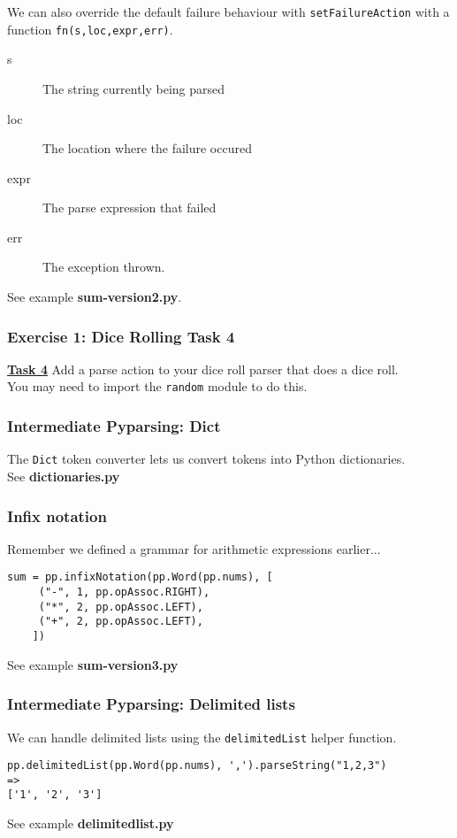 \documentclass{beamer}
\begin{document}
\begin{frame}
We can also override the default failure behaviour with \texttt{setFailureAction} with a function \texttt{fn(s,loc,expr,err)}. \\
\begin{description}
\item[s] The string currently being parsed
\item[loc] The location where the failure occured
\item[expr] The parse expression that failed
\item[err] The exception thrown.
\end{description}
\medskip
See example \textbf{sum-version2.py}.
\end{frame}


\begin{frame}
\frametitle{Exercise 1: Dice Rolling Task 4}
\textbf{\underline{Task 4}} Add a parse action to your dice roll parser that does a dice roll. \\
\medskip
You may need to import the \texttt{random} module to do this.
\end{frame}

\begin{frame}
\frametitle{Intermediate Pyparsing: Dict}
The \texttt{Dict} token converter lets us convert tokens into Python dictionaries. \\
\bigskip
See \textbf{dictionaries.py}

\end{frame}

\begin{frame}[fragile]
\frametitle{Infix notation}
Remember we defined a grammar for arithmetic expressions earlier...
\begin{verbatim}
sum = pp.infixNotation(pp.Word(pp.nums), [
     ("-", 1, pp.opAssoc.RIGHT),
     ("*", 2, pp.opAssoc.LEFT),
     ("+", 2, pp.opAssoc.LEFT),
    ])
\end{verbatim}
See example \textbf{sum-version3.py}
\end{frame}

\begin{frame}[fragile]
\frametitle{Intermediate Pyparsing: Delimited lists}
We can handle delimited lists using the \texttt{delimitedList} helper function. \\
\begin{verbatim}
pp.delimitedList(pp.Word(pp.nums), ',').parseString("1,2,3")
=>
['1', '2', '3']
\end{verbatim}

\bigskip
See example \textbf{delimitedlist.py}

\end{frame}
\end{document}
